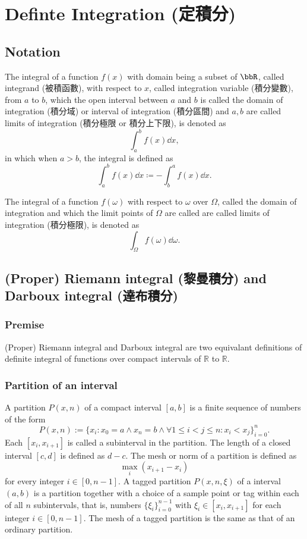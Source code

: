 \section{Definte Integration (定積分)}
\subsection{Notation}
The integral of a function $f(x)$ with domain being a subset of $\bbR$, called integrand (被積函數), with respect to $x$, called integration variable (積分變數), from $a$ to $b$, which the open interval between $a$ and $b$ is called the domain of integration (積分域) or interval of integration (積分區間) and $a,b$ are called limits of integration (積分極限 or 積分上下限), is denoted as
\[\int_a^bf(x)\dd{x},\]
in which when $a>b$, the integral is defined as
\[\int_a^bf(x)\dd{x}\coloneq-\int_b^af(x)\dd{x}.\]

The integral of a function $f(\omega)$ with respect to $\omega$ over $\Omega$, called the domain of integration and which the limit points of $\Omega$ are called are called limits of integration (積分極限), is denoted as
\[\int_{\Omega}f(\omega)\dd{\omega}.\]
\subsection{(Proper) Riemann integral (黎曼積分) and Darboux integral (達布積分)}
\subsubsection{Premise}
(Proper) Riemann integral and Darboux integral are two equivalant definitions of definite integral of functions over compact intervals of $\mathbb{R}$ to $\mathbb{R}$.
\subsubsection{Partition of an interval}
A partition $P(x, n)$ of a compact interval $[a,b]$ is a finite sequence of numbers of the form
\[P(x, n):=\{x_i\colon x_0=a\land x_n=b\land\forall 1\leq i<j\leq n\colon x_i<x_j\}_{i=0}^n.\]
Each $[x_i, x_{i+1}]$ is called a subinterval in the partition. The length of a closed interval $[c,d]$ is defined as $d-c$. The mesh or norm of a partition is defined as
\[\max_i\left(x_{i+1}-x_{i}\right)\]
for every integer $i\in [0,n-1]$.
A tagged partition $P(x,n,\xi)$ of a interval $(a,b)$ is a partition together with a choice of a sample point or tag within each of all $n$ subintervals, that is, numbers $\{\xi_i\}_{i=0}^{n-1}$ with $\xi_i\in [x_i,x_{i+1}]$ for each integer $i\in [0,n-1]$. The mesh of a tagged partition is the same as that of an ordinary partition.

